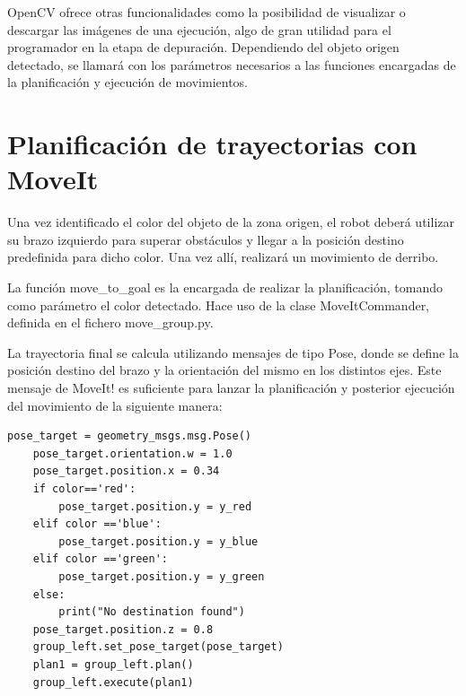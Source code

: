 \documentclass[12pt,spanish,chapterprefix, numbers=noenddot]{book}
\numberwithin{equation}{section}
\numberwithin{figure}{section}
\begin{document}
OpenCV ofrece otras funcionalidades como la posibilidad de visualizar o descargar las imágenes de una ejecución, algo de gran utilidad para el programador en la etapa de depuración. 
Dependiendo del objeto origen detectado, se llamará con los parámetros necesarios a las funciones encargadas de la planificación y ejecución de movimientos.

\section{Planificación de trayectorias con MoveIt}
Una vez identificado el color del objeto de la zona origen, el robot deberá utilizar su brazo izquierdo para superar obstáculos y llegar a la posición destino predefinida para dicho color. Una vez allí, realizará un movimiento de derribo. 

La función move\_to\_goal es la encargada de realizar la planificación, tomando como parámetro el color detectado.
Hace uso de la clase MoveItCommander, definida en el fichero move\_group.py.  
	
La trayectoria final se calcula utilizando mensajes de tipo Pose, donde se define la posición destino del brazo y la orientación del mismo en los distintos ejes. Este mensaje de MoveIt! es suficiente para lanzar la planificación y posterior ejecución del movimiento de la siguiente manera: 
\vspace{20pt}
	\begin{lstlisting}[frame=single] 
    pose_target = geometry_msgs.msg.Pose()
    pose_target.orientation.w = 1.0
    pose_target.position.x = 0.34 
    if color=='red':
        pose_target.position.y = y_red
    elif color =='blue':
        pose_target.position.y = y_blue
    elif color =='green':
        pose_target.position.y = y_green
    else:
        print("No destination found")
    pose_target.position.z = 0.8 
    group_left.set_pose_target(pose_target)
    plan1 = group_left.plan()
    group_left.execute(plan1)
	\end{lstlisting}
\end{document}
